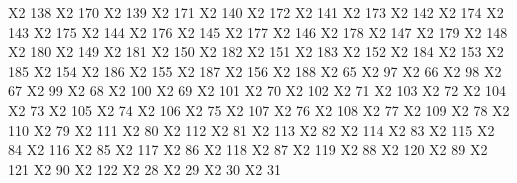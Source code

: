 \exchardef \CYRKBEAK X2  138
\exchardef \cyrkbeak X2  170
\exchardef \CYRKHK   X2  139
\exchardef \cyrkhk   X2  171
\exchardef \CYRLHK   X2  140
\exchardef \cyrlhk   X2  172
\exchardef \CYRNDSC  X2  141
\exchardef \cyrndsc  X2  173
\exchardef \CYRNG    X2  142
\exchardef \cyrng    X2  174
\exchardef \CYRNHK   X2  143
\exchardef \cyrnhk   X2  175
\exchardef \CYROTLD  X2  144
\exchardef \cyrotld  X2  176
\exchardef \CYRSDSC  X2  145
\exchardef \cyrsdsc  X2  177
\exchardef \CYRUSHRT X2  146
\exchardef \cyrushrt X2  178
\exchardef \CYRY     X2  147
\exchardef \cyry     X2  179
\exchardef \CYRYHCRS X2  148
\exchardef \cyryhcrs X2  180
\exchardef \CYRHDSC  X2  149
\exchardef \cyrhdsc  X2  181
\exchardef \CYRHHK   X2  150
\exchardef \cyrhhk   X2  182
\exchardef \CYRCHLDSC X2 151
\exchardef \cyrchldsc X2 183
\exchardef \CYRCHRDSC X2 152
\exchardef \cyrchrdsc X2 184
\exchardef \CYRIE    X2  153
\exchardef \cyrie    X2  185
\exchardef \CYRSCHWA X2  154
\exchardef \cyrschwa X2  186
\exchardef \CYREPS   X2  155
\exchardef \cyreps   X2  187
\exchardef \CYRYO    X2  156
\exchardef \cyryo    X2  188
\exchardef \CYRAE    X2  65
\exchardef \cyrae    X2  97
\exchardef \CYRDJE   X2  66
\exchardef \cyrdje   X2  98
\exchardef \CYRTSHE  X2  67
\exchardef \cyrtshe  X2  99
\exchardef \CYRABHCH X2  68
\exchardef \cyrabhch X2  100
\exchardef \CYRABHCHDSC X2  69
\exchardef \cyrabhchdsc X2  101
\exchardef \CYRKVCRS X2  70
\exchardef \cyrkvcrs X2  102
\exchardef \CYRKHCRS X2  71
\exchardef \cyrkhcrs X2  103
\exchardef \CYRLDSC  X2  72
\exchardef \cyrldsc  X2  104
\exchardef \CYRII    X2  73
\exchardef \cyrii    X2  105
\exchardef \CYRJE    X2  74
\exchardef \cyrje    X2  106
\exchardef \CYRLJE   X2  75
\exchardef \cyrlje   X2  107
\exchardef \CYRMDSC  X2  76
\exchardef \cyrmdsc  X2  108
\exchardef \CYRNJE   X2  77
\exchardef \cyrnje   X2  109
\exchardef \CYRABHHA X2  78
\exchardef \cyrabhha X2  110
\exchardef \CYRPHK   X2  79
\exchardef \cyrphk   X2  111
\exchardef \CYRRDSC  X2  80
\exchardef \cyrrdsc  X2  112
\exchardef \CYRQ     X2  81
\exchardef \cyrq     X2  113
\exchardef \CYRTDSC  X2  82
\exchardef \cyrtdsc  X2  114
\exchardef \CYRDZE   X2  83
\exchardef \cyrdze   X2  115
\exchardef \CYRTETSE X2  84
\exchardef \cyrtetse X2  116
\exchardef \CYRDZHE  X2  85
\exchardef \cyrdzhe  X2  117
\exchardef \CYRCHVCRS X2  86
\exchardef \cyrchvcrs X2  118
\exchardef \CYRW     X2  87
\exchardef \cyrw     X2  119
\exchardef \CYRYAT   X2  88
\exchardef \cyryat   X2  120
\exchardef \CYRBYUS  X2  89
\exchardef \cyrbyus  X2  121
\exchardef \CYRIZH   X2  90
\exchardef \cyrizh   X2  122
\exchardef \CYRDELTA X2  28
\exchardef \cyrdelta X2  29
\exchardef \CYRNLHK  X2  30
\exchardef \cyrnlhk  X2  31

